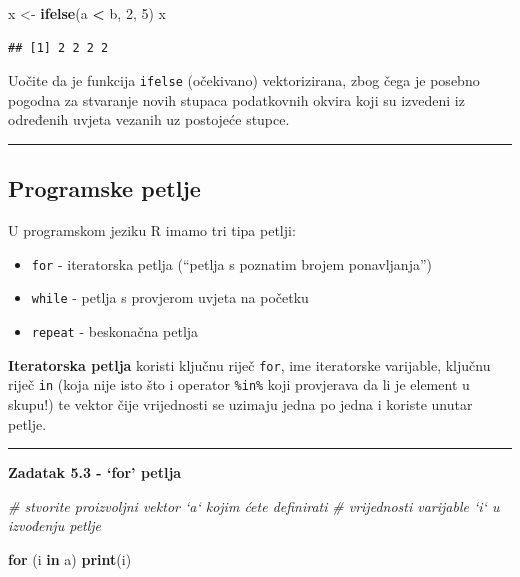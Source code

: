 \documentclass[]{book}
\newenvironment{Shaded}{\begin{snugshade}}{\end{snugshade}}
\newcommand{\KeywordTok}[1]{\textcolor[rgb]{0.13,0.29,0.53}{\textbf{#1}}}
\newcommand{\DecValTok}[1]{\textcolor[rgb]{0.00,0.00,0.81}{#1}}
\newcommand{\StringTok}[1]{\textcolor[rgb]{0.31,0.60,0.02}{#1}}
\newcommand{\CommentTok}[1]{\textcolor[rgb]{0.56,0.35,0.01}{\textit{#1}}}
\newcommand{\ControlFlowTok}[1]{\textcolor[rgb]{0.13,0.29,0.53}{\textbf{#1}}}
\newcommand{\OperatorTok}[1]{\textcolor[rgb]{0.81,0.36,0.00}{\textbf{#1}}}
\newcommand{\NormalTok}[1]{#1}
\providecommand{\tightlist}{%
  \setlength{\itemsep}{0pt}\setlength{\parskip}{0pt}}
\theoremstyle{definition}
\theoremstyle{definition}
\theoremstyle{definition}
\theoremstyle{remark}
\begin{document}
\begin{Shaded}
\begin{Highlighting}[]
\NormalTok{x <-}\StringTok{ }\KeywordTok{ifelse}\NormalTok{(a }\OperatorTok{<}\StringTok{ }\NormalTok{b, }\DecValTok{2}\NormalTok{, }\DecValTok{5}\NormalTok{)}
\NormalTok{x}
\end{Highlighting}
\end{Shaded}

\begin{verbatim}
## [1] 2 2 2 2
\end{verbatim}

Uočite da je funkcija \texttt{ifelse} (očekivano) vektorizirana, zbog
čega je posebno pogodna za stvaranje novih stupaca podatkovnih okvira
koji su izvedeni iz određenih uvjeta vezanih uz postojeće stupce.

\begin{center}\rule{0.5\linewidth}{\linethickness}\end{center}

\subsection{Programske petlje}\label{programske-petlje}

U programskom jeziku R imamo tri tipa petlji:

\begin{itemize}
\tightlist
\item
  \texttt{for} - iteratorska petlja (``petlja s poznatim brojem
  ponavljanja'')
\item
  \texttt{while} - petlja s provjerom uvjeta na početku
\item
  \texttt{repeat} - beskonačna petlja
\end{itemize}

\textbf{Iteratorska petlja} koristi ključnu riječ \texttt{for}, ime
iteratorske varijable, ključnu riječ \texttt{in} (koja nije isto što i
operator \texttt{\%in\%} koji provjerava da li je element u skupu!) te
vektor čije vrijednosti se uzimaju jedna po jedna i koriste unutar
petlje.

\begin{center}\rule{0.5\linewidth}{\linethickness}\end{center}

\textbf{Zadatak 5.3 - `for' petlja}

\begin{Shaded}
\begin{Highlighting}[]
\CommentTok{# stvorite proizvoljni vektor `a` kojim ćete definirati}
\CommentTok{# vrijednosti varijable `i` u izvođenju petlje}

\ControlFlowTok{for}\NormalTok{ (i }\ControlFlowTok{in}\NormalTok{ a) }\KeywordTok{print}\NormalTok{(i)}
\end{Highlighting}
\end{Shaded}
\end{document}
